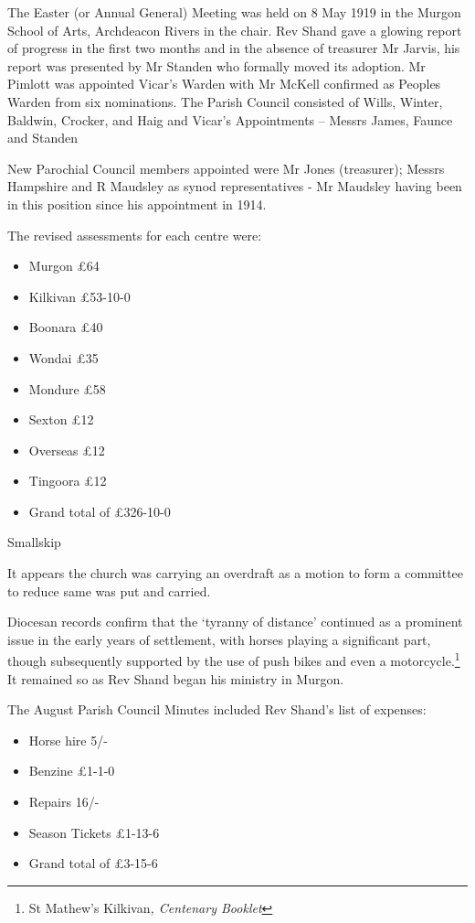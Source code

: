The Easter (or Annual General) Meeting was held on 8 May 1919 in the Murgon School of Arts, Archdeacon Rivers in the chair. Rev Shand gave a glowing report of progress in the first two months and in the absence of treasurer Mr Jarvis, his report was presented by Mr Standen who formally moved its adoption. Mr Pimlott was appointed Vicar's Warden with Mr McKell confirmed as Peoples Warden from six nominations. The Parish Council consisted of Wills, Winter, Baldwin, Crocker, and Haig and Vicar's Appointments -- Messrs James, Faunce and Standen

New Parochial Council members appointed were Mr Jones (treasurer); Messrs Hampshire and R Maudsley as synod representatives - Mr Maudsley having been in this position since his appointment in 1914.

The revised assessments for each centre were:

\begin{itemize}
\item
  Murgon £64
\item
  Kilkivan £53-10-0
\item
  Boonara £40
\item
  Wondai £35
\item
  Mondure £58
\item
  Sexton £12
\item
  Overseas £12
\item
  Tingoora £12
\item
  Grand total of £326-10-0
\end{itemize}

Smallskip

It appears the church was carrying an overdraft as a motion to form a committee to reduce same was put and carried.

Diocesan records confirm that the `tyranny of distance' continued as a prominent issue in the early years of settlement, with horses playing a significant part, though subsequently supported by the use of push bikes and even a motorcycle.\footnote{St Mathew's Kilkivan\emph{, Centenary Booklet}} It remained so as Rev Shand began his ministry in Murgon.

The August Parish Council Minutes included Rev Shand's list of expenses:

\begin{itemize}
\item
  Horse hire 5/-
\item
  Benzine £1-1-0
\item
  Repairs 16/-
\item
  Season Tickets £1-13-6
\item
  Grand total of £3-15-6
\end{itemize}

